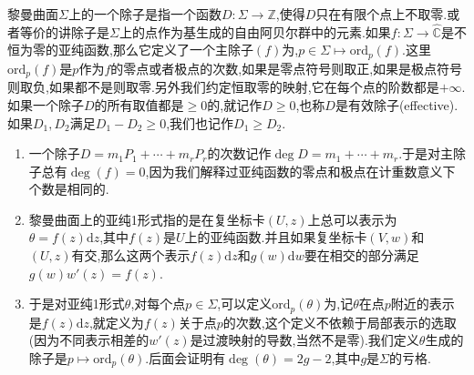 黎曼曲面$\Sigma$上的一个除子是指一个函数$D:\Sigma\to\mathbb{Z}$,使得$D$只在有限个点上不取零.或者等价的讲除子是$\Sigma$上的点作为基生成的自由阿贝尔群中的元素.如果$f:\Sigma\to\widehat{\mathbb{C}}$是不恒为零的亚纯函数,那么它定义了一个主除子$(f)$为,$p\in\Sigma\mapsto\mathrm{ord}_p(f)$.这里$\mathrm{ord}_p(f)$是$p$作为$f$的零点或者极点的次数,如果是零点符号则取正,如果是极点符号则取负,如果都不是则取零.另外我们约定恒取零的映射,它在每个点的阶数都是$+\infty$.如果一个除子$D$的所有取值都是$\ge0$的,就记作$D\ge0$,也称$D$是有效除子(effective).如果$D_1,D_2$满足$D_1-D_2\ge0$,我们也记作$D_1\ge D_2$.
\begin{enumerate}
	\item 一个除子$D=m_1P_1+\cdots+m_rP_r$的次数记作$\deg D=m_1+\cdots+m_r$.于是对主除子总有$\deg(f)=0$,因为我们解释过亚纯函数的零点和极点在计重数意义下个数是相同的.
	\item 黎曼曲面上的亚纯1形式指的是在复坐标卡$(U,z)$上总可以表示为$\theta=f(z)\mathrm{d}z$,其中$f(z)$是$U$上的亚纯函数.并且如果复坐标卡$(V,w)$和$(U,z)$有交,那么这两个表示$f(z)\mathrm{d}z$和$g(w)\mathrm{d}w$要在相交的部分满足$g(w)w'(z)=f(z)$.
	\item 于是对亚纯1形式$\theta$,对每个点$p\in\Sigma$,可以定义$\mathrm{ord}_p(\theta)$为,记$\theta$在点$p$附近的表示是$f(z)\mathrm{d}z$,就定义为$f(z)$关于点$p$的次数,这个定义不依赖于局部表示的选取(因为不同表示相差的$w'(z)$是过渡映射的导数,当然不是零).我们定义$\theta$生成的除子是$p\mapsto\mathrm{ord}_p(\theta)$.后面会证明有$\deg(\theta)=2g-2$,其中$g$是$\Sigma$的亏格.
\end{enumerate}

